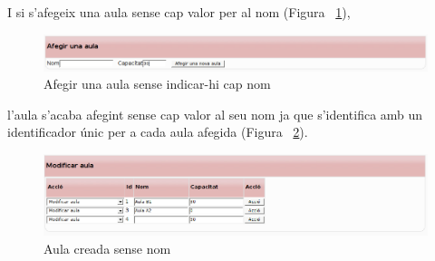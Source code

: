 \documentclass[a4paper]{report}  %
\begin{document}
\begin{itemize}
I si s'afegeix una aula sense cap valor per al nom (Figura ~\ref{fig:AddAulaBlankName}), 
\begin{figure}[H] %
\begin{center}
\includegraphics[width=16cm]{img/AddAulaBlankName.png}
\caption[List caption]{Afegir una aula sense indicar-hi cap nom}
\label{fig:AddAulaBlankName}
\end{center}
\end{figure}
l'aula s'acaba afegint sense cap valor al seu nom ja que s'identifica amb un identificador únic per a cada aula afegida (Figura ~\ref{fig:AddAulaNoName}).
\begin{figure}[H] %
\begin{center}
\includegraphics[width=16cm]{img/AddAulaNoName.png}
\caption[List caption]{Aula creada sense nom}
\label{fig:AddAulaNoName}
\end{center}
\end{figure}



\end{itemize}
\end{document}
